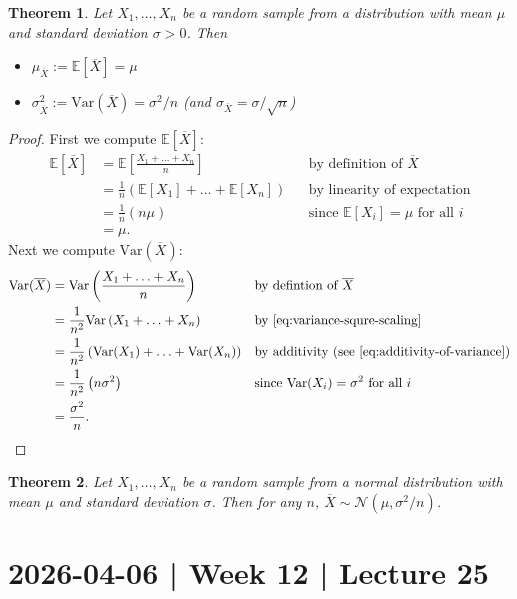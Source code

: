 \documentclass[10pt]{article}
\newtheorem{theorem}{Theorem}
\theoremstyle{definition}
\newcommand{\1}[1]{\textbf{1}_{\left[#1\right]}} %
\def\E{\mathbb{E}} %
\def\Var{\mathrm{Var}} %
\begin{document}
\begin{theorem}
  Let $X_{1},\ldots,X_{n}$ be a random sample from a distribution with mean $\mu$ and standard
  deviation $\sigma>0$. Then
  \begin{itemize}
    \item $\mu_{\overline{X}}:=\E\left[\overline{X} \right]= \mu$
    \item $\sigma^{2}_{\overline{X}}:= \Var(\overline{X})= \sigma^{2}/n$ (and  $\sigma_{\overline{X}}=\sigma/\sqrt{n}$)
  \end{itemize}
\end{theorem}
\begin{proof}
  First we compute $\E\left[\overline{X} \right]$:
  \begin{align*}
    \E\left[\overline{X} \right] 
    &= \E\left[\frac{X_{1}+\ldots+X_{n}}{n} \right] &&\text{by definition of $\overline{X}$}\\
    &= \frac{1}{n}\left( \E\left[X_{1} \right]+\ldots+ \E\left[X_{n} \right] \right)  &&\text{by linearity of expectation}\\
    &= \frac{1}{n}\left( n\mu \right) &&\text{since $\E\left[X_{i} \right]=\mu$ for all $i$}\\
    &= \mu.
  \end{align*}
  Next we compute $\Var(\overline{X})$:
  \begin{align*}
    \Var(\overline{X})
    &= \Var \left( \frac{X_{1}+\ldots+X_{n}}{n} \right) &&\text{by defintion of $\overline{X}$}\\
    &= \frac{1}{n^{2}}\Var \left( X_{1}+\ldots+X_{n} \right) &&\text{by \cref{eq:variance-squre-scaling}}\\
    &= \frac{1}{n^{2}}\left( \Var(X_{1})+\ldots+\Var(X_{n}) \right) &&\text{by additivity (see \cref{eq:additivity-of-variance})}\\
    &= \frac{1}{n^{2}} \left( n\sigma^{2} \right) &&\text{since $\Var(X_{i})=\sigma^{2}$ for all $i$}\\
    &= \frac{\sigma^{2}}{n}.
  \end{align*}
\end{proof}

\begin{theorem}
  Let $X_{1},\ldots,X_{n}$ be a random sample from a normal distribution with
  mean $\mu$ and standard deviation $\sigma$. Then for any $n$,
  $\overline{X}\sim \mathcal{N}(\mu,\sigma^{2}/n)$.
\end{theorem}


\newpage
\section{2026-04-06 | Week 12 | Lecture 25}
\end{document}
